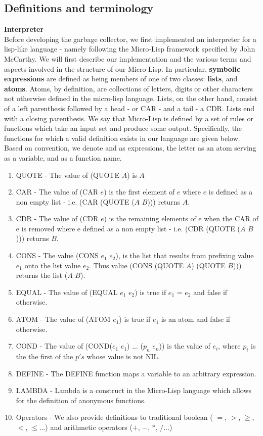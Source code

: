 \documentclass[11pt,leqno]{article}
\newcommand{\mydef}[1]{\textbf{#1}}
\begin{document}
\subsection{Definitions and terminology}
\textbf{Interpreter}\\
Before developing the garbage collector, we first implemented an interpreter for a lisp-like language - namely following the Micro-Lisp framework specified by John McCarthy\cite{mccarthy}. We will first describe our implementation and the various terms and aspects involved in the structure of our Micro-Lisp. In particular, \mydef{symbolic expressions} are defined as being members of one of two classes: \mydef{lists}, and \mydef{atoms}. Atoms, by definition, are collections of letters, digits or other characters not otherwise defined in the micro-lisp language. Lists, on the other hand, consist of a left parenthesis followed by a head - or CAR -  and a tail - a CDR. Lists end with a closing parenthesis. We say that Micro-Lisp is defined by a set of rules or functions which take an input set and produce some output. Specifically, the functions for which a valid definition exists in our language are given below. Based on convention, we denote  and  as expressions, the letter  as an atom serving as a variable, and  as a function name.
\begin{enumerate}
  \item QUOTE - The value of (QUOTE $A$) is $A$
  \item CAR - The value of (CAR $e$) is the first element of $e$ where $e$ is defined as a non empty list - i.e. (CAR (QUOTE ($A$ $B$))) returns $A$. 
  \item CDR - The value of (CDR $e$) is the remaining elements of e when the CAR of e is removed where e defined as a non empty list - i.e. (CDR (QUOTE ($A$ $B$))) returns $B$. 
  \item CONS - The value (CONS $e_1$ $e_2$), is the list that results from prefixing value $e_1$ onto the list value $e_2$. Thus value (CONS (QUOTE $A$) (QUOTE $B$))) returns the list ($A$ $B$).
  \item EQUAL - The value of (EQUAL $e_1$ $e_2$) is true if $e_1$ = $e_2$ and false if otherwise.
  \item ATOM - The value of (ATOM $e_1$) is true if $e_1$ is an atom and false if otherwise.
  \item COND - The value of (COND($e_1$ $e_1$) ... ($p_n$ $e_n$)) is the value of $e_i$, where $p_i$ is the the 
first of the $p's$ whose value is not NIL.
  \item DEFINE - The DEFINE function maps a variable to an arbitrary expression.
  \item LAMBDA - Lambda is a construct in the Micro-Lisp language which allows for the definition of anonymous functions.
  \item Operators - We also provide definitions to traditional boolean ( $=$, $>$, $\geq$, $<$, $\leq$...) and arithmetic operators ($+$, $-$, $*$, $/$...)
\end{enumerate}
\end{document}
